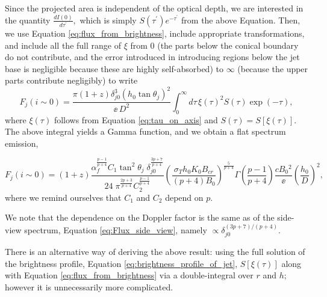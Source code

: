 Since the projected area is independent of the optical depth, we are interested in the quantity $ \frac{dI(0)}{d \tau^{'}}, $ which is simply $ S(\tau^{'}) e^{- \tau^{'}} $ from the above Equation. Then, we use Equation \ref{eq:flux_from_brightness}, include appropriate transformations, and include all the full range of $ \xi $ from $ 0 $ (the parts below the conical boundary do not contribute, and the error introduced in introducing regions below the jet base is negligible because these are highly self-absorbed) to $ \infty $ (because the upper parts contribute negligibly) to write
\begin{equation}
F_j (i \sim 0) = \dfrac {\pi (1+z) \delta_{j0}^3 (h_0 \tan \theta_j)^2}{\ee \, D^2} \int_0^\infty d\tau\, \xi(\tau)^2 S(\tau) \exp(-\tau), \label{eq:jet_flux_integral}
\end{equation}
where $\xi(\tau)$ follows from Equation \ref{eq:tau_on_axis} and $ S(\tau) = S[ \xi(\tau) ] . $ The above integral yields a Gamma function, and we obtain a flat spectrum emission,

\begin{equation}
F_j (i \sim 0) = (1+z) \dfrac{ \alpha_f^{\frac{p-1}{p+4} } C_1 \tan ^2 \theta_{j} \; \delta_{j0}^{\frac{3p+7}{p+4}}}{24 \; \pi^{\frac{2p+3}{p+4}} C_2^{\frac{p-1}{p+4}}}\left(\dfrac{ \sigma_T h_0 K_0 B_{cr}}{(p+4)B_0}\right)^{\frac{5}{p+4}}\Gamma\left(\frac{p-1}{p+4}\right) \frac{ c B_0{^2} }{\ee} \left(\frac{h_0}{D}\right)^2, \label{eq:Flux_jet_on_axis}
\end{equation}
where we remind ourselves that $ C_1 $ and $ C_2 $ depend on $ p . $

We note that the dependence on the Doppler factor is the same as of the side-view spectrum, Equation \ref{eq:Flux_side_view}, namely $ \propto \delta_{j0}^{(3p+7)/(p+4)} . $

There is an alternative way of deriving the above result: using the full solution of the brightness profile, Equation \ref{eq:brightness_profile_of_jet}, $ S[\xi(\tau)] $ along with Equation \ref{eq:flux_from_brightness} via a double-integral over $ r $ and $ h ; $ however it is unnecessarily more complicated.

